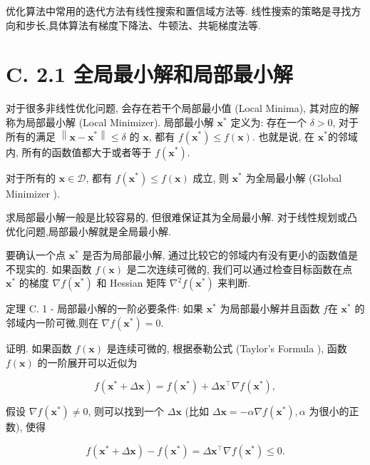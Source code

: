 \documentclass[10pt]{article}
\begin{document}
优化算法中常用的迭代方法有线性搜索和置信域方法等. 线性搜索的策略是寻找方向和步长,具体算法有梯度下降法、牛顿法、共轭梯度法等.

\section*{C. 2.1 全局最小解和局部最小解}
对于很多非线性优化问题, 会存在若干个局部最小值 (Local Minima), 其对应的解称为局部最小解 (Local Minimizer). 局部最小解 $\boldsymbol{x}^{*}$ 定义为: 存在一个 $\delta>0$, 对于所有的满足 $\left\|\boldsymbol{x}-\boldsymbol{x}^{*}\right\| \leq \delta$ 的 $\boldsymbol{x}$, 都有 $f\left(\boldsymbol{x}^{*}\right) \leq f(\boldsymbol{x})$. 也就是说, 在 $\boldsymbol{x}^{*}$的邻域内, 所有的函数值都大于或者等于 $f\left(\boldsymbol{x}^{*}\right)$.

对于所有的 $\boldsymbol{x} \in \mathcal{D}$, 都有 $f\left(\boldsymbol{x}^{*}\right) \leq f(\boldsymbol{x})$ 成立, 则 $\boldsymbol{x}^{*}$ 为全局最小解 (Global Minimizer ).

求局部最小解一般是比较容易的, 但很难保证其为全局最小解. 对于线性规划或凸优化问题,局部最小解就是全局最小解.

要确认一个点 $\boldsymbol{x}^{*}$ 是否为局部最小解, 通过比较它的邻域内有没有更小的函数值是不现实的. 如果函数 $f(\boldsymbol{x})$ 是二次连续可微的, 我们可以通过检查目标函数在点 $\boldsymbol{x}^{*}$ 的梯度 $\nabla f\left(\boldsymbol{x}^{*}\right)$ 和 Hessian 矩阵 $\nabla^{2} f\left(\boldsymbol{x}^{*}\right)$ 来判断.

定理 C. 1 - 局部最小解的一阶必要条件: 如果 $\boldsymbol{x}^{*}$ 为局部最小解并且函数 $f$在 $\boldsymbol{x}^{*}$ 的邻域内一阶可微,则在 $\nabla f\left(\boldsymbol{x}^{*}\right)=0$.

证明. 如果函数 $f(\boldsymbol{x})$ 是连续可微的, 根据泰勒公式 (Taylor's Formula ), 函数 $f(\boldsymbol{x})$ 的一阶展开可以近似为


\begin{equation*}
f\left(\boldsymbol{x}^{*}+\Delta \boldsymbol{x}\right)=f\left(\boldsymbol{x}^{*}\right)+\Delta \boldsymbol{x}^{\top} \nabla f\left(\boldsymbol{x}^{*}\right), \tag{C.3}
\end{equation*}


假设 $\nabla f\left(\boldsymbol{x}^{*}\right) \neq 0$, 则可以找到一个 $\Delta \boldsymbol{x}$ (比如 $\Delta \boldsymbol{x}=-\alpha \nabla f\left(\boldsymbol{x}^{*}\right), \alpha$ 为很小的正数), 使得


\begin{equation*}
f\left(\boldsymbol{x}^{*}+\Delta \boldsymbol{x}\right)-f\left(\boldsymbol{x}^{*}\right)=\Delta \boldsymbol{x}^{\top} \nabla f\left(\boldsymbol{x}^{*}\right) \leq 0 . \tag{C.4}
\end{equation*}
\end{document}
